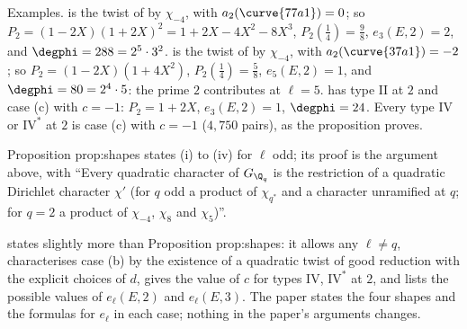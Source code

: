 Examples.  is the twist of  by $\chi_{-4}$, with $a_2(\curve{77a1})=0$; so $P_2=(1-2X)(1+2X)^2=1+2X-4X^2-8X^3$, $P_2(\frac14)=\frac98$, $e_3(E,2)=2$, and
$\degphi=288=2^5\cdot3^2$.  is the twist of  by $\chi_{-4}$, with $a_2(\curve{37a1})=-2$; so $P_2=(1-2X)(1+4X^2)$, $P_2(\frac14)=\frac58$, $e_5(E,2)=1$, and
$\degphi=80=2^4\cdot5$: the prime $2$ contributes at $\ell=5$.  has type $\mathrm{II}$ at $2$ and case (c) with $c=-1$: $P_2=1+2X$, $e_3(E,2)=1$, $\degphi=24$. Every type $\mathrm{IV}$
or $\mathrm{IV}^*$ at $2$ is case (c) with $c=-1$ ($4{,}750$ pairs), as the proposition proves.

\begin{paperlink}
Proposition prop:shapes states (i) to (iv) for $\ell$ odd; its proof is the argument above, with ``Every quadratic character of $G_{\Q_q}$ is the restriction of a
quadratic Dirichlet character $\chi'$ (for $q$ odd a product of $\chi_{q^*}$ and a character unramified at $q$; for $q=2$ a product of $\chi_{-4}$, $\chi_8$ and $\chi_5$)''.
\end{paperlink}

\begin{remark}\label{rem:lfunctions:shapes-commentary}
 states slightly more than Proposition prop:shapes: it allows any $\ell\ne q$, characterises case (b) by the existence of a quadratic twist of good
reduction with the explicit choices of $d$, gives the value of $c$ for types $\mathrm{IV}$, $\mathrm{IV}^*$ at $2$, and lists the possible values of $e_\ell(E,2)$ and $e_\ell(E,3)$. The paper
states the four shapes and the formulas for $e_\ell$ in each case; nothing in the paper's arguments changes.
\end{remark}

